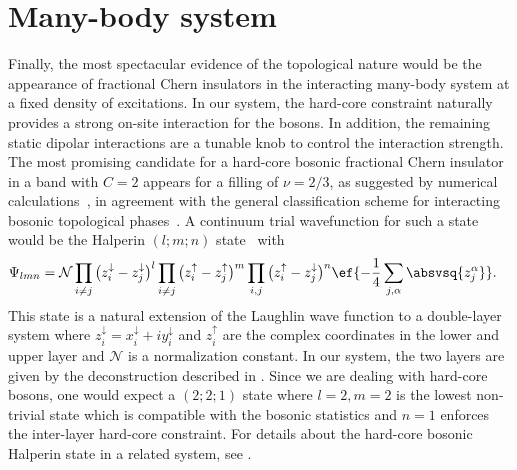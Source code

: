 \section{Many-body system}
Finally, the most spectacular evidence of the topological nature would be the appearance of fractional Chern insulators in the interacting many-body system at a fixed density of excitations.
In our system, the hard-core constraint naturally provides a strong on-site interaction for the bosons.
In addition, the remaining static dipolar interactions are a tunable knob to control the interaction strength.
The most promising candidate for a hard-core bosonic fractional Chern insulator in a band with $C=2$ appears for a filling of $\nu = 2/3$, as suggested by numerical calculations~\cite{Moller2009,Wang2012a,Yao2015}, in agreement with the general classification scheme for interacting bosonic topological phases~\cite{Lu2012a,Chen2013}.
A continuum trial wavefunction for such a state would be the Halperin $(l;m;n)$ state~\cite{Halperin1984,Wu2013,Yao2013,Wang2012a,Wang2011,Yao2015} with
\begin{align}
    \Psi_{lmn} &= \mathcal{N}
    \prod_{i\ne j} \big(z_i^\downarrow - z_j^\downarrow\big)^l
    \prod_{i\ne j} \big(z_i^\uparrow -   z_j^\uparrow  \big)^m
    \prod_{i, j} \big(z_i^\uparrow -   z_j^\downarrow\big)^n
    \ef{-\frac{1}{4}\sum_{j,\alpha} \absvsq{z^\alpha_j} }.
\end{align}
This state is a natural extension of the Laughlin wave function to a double-layer system where $z_i^\downarrow=x_i^\downarrow+i y_i^\downarrow$ and $z_i^\uparrow$ are the complex coordinates in the lower and upper layer and $\mathcal{N}$ is a normalization constant.
In our system, the two layers are given by the deconstruction described in .
Since we are dealing with hard-core bosons, one would expect a $(2;2;1)$ state where $l=2, m=2$ is the lowest non-trivial state which is compatible with the bosonic statistics and $n=1$ enforces the inter-layer hard-core constraint.
For details about the hard-core bosonic Halperin state in a related system, see .

